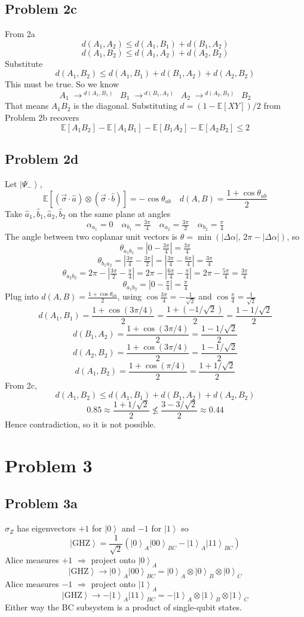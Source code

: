 \documentclass[
]{article}
\providecommand{\ket}[1]{\left\lvert #1 \right\rangle}
\providecommand{\Rarr}{\Rightarrow}
\providecommand{\rarr}{\rightarrow}
\begin{document}
\subsection*{Problem 2c}
From 2a
\[
	d(A_1,A_2)\leq d(A_1,B_1)+d(B_1,A_2)
\]
\[
	d(A_1,B_2)\leq d(A_1,A_2)+d(A_2,B_2)
\]
Substitute
\[
	d(A_1,B_2)\leq d(A_1,B_1)+d(B_1,A_2)+d(A_2,B_2)
\]
This must be true.
So we know
\[
	A_1\;\rarr^{\;d(A_1,B_1)\;}\;B_1\;\rarr^{\;d(B_1,A_2)\;}\;A_2\;\rarr^{\;d(A_2,B_2)\;}\;B_2
\]
That means $A_1B_2$ is the diagonal.
Substituting $d=(1-\mathbb{E}[XY])/2$ from Problem 2b recovers
\[
	\mathbb{E}[A_1B_2]-\mathbb{E}[A_1B_1]-\mathbb{E}[B_1A_2]-\mathbb{E}[A_2B_2]\leq 2
\]

\subsection*{Problem 2d}
Let $\ket{\Psi_-}$,
\[
	\mathbb{E}[(\vec{\sigma}\cdot\hat{a})\otimes(\vec{\sigma}\cdot\hat{b})]=-\cos\theta_{ab}\quad d(A,B)=\frac{1+\cos\theta_{ab}}{2}
\]
Take $\hat{a}_1,\hat{b}_1,\hat{a}_2,\hat{b}_2$ on the same plane at angles
\[
	\alpha_{a_1}=0\quad \alpha_{b_1}=\tfrac{3\pi}{4}\quad \alpha_{a_2}=\tfrac{3\pi}{2}\quad \alpha_{b_2}=\tfrac{\pi}{4}
\]
The angle between two coplanar unit vectors is $\theta=\min(|\Delta\alpha|,\,2\pi-|\Delta\alpha|)$, so
\[
	\theta_{a_1b_1}=|0-\tfrac{3\pi}{4}|=\tfrac{3\pi}{4}
\]
\[
	\theta_{b_1a_2}=|\tfrac{3\pi}{4}-\tfrac{3\pi}{2}|=|\tfrac{3\pi}{4}-\tfrac{6\pi}{4}|=\tfrac{3\pi}{4}
\]
\[
	\theta_{a_2b_2}=2\pi-|\tfrac{3\pi}{2}-\tfrac{\pi}{4}|=2\pi-|\tfrac{6\pi}{4}-\tfrac{\pi}{4}|=2\pi-\tfrac{5\pi}{4}=\tfrac{3\pi}{4}
\]
\[
	\theta_{a_1b_2}=|0-\tfrac{\pi}{4}|=\tfrac{\pi}{4}
\]
Plug into $d(A,B)=\frac{1+\cos\theta_{ab}}{2}$, using $\cos\tfrac{3\pi}{4}=-\tfrac{1}{\sqrt{2}}$ and $\cos\tfrac{\pi}{4}=\tfrac{1}{\sqrt{2}}$
\[
	d(A_1,B_1)=\frac{1+\cos(3\pi/4)}{2}=\frac{1+(-1/\sqrt{2})}{2}=\frac{1-1/\sqrt{2}}{2}
\]
\[
	d(B_1,A_2)=\frac{1+\cos(3\pi/4)}{2}=\frac{1-1/\sqrt{2}}{2}
\]
\[
	d(A_2,B_2)=\frac{1+\cos(3\pi/4)}{2}=\frac{1-1/\sqrt{2}}{2}
\]
\[
	d(A_1,B_2)=\frac{1+\cos(\pi/4)}{2}=\frac{1+1/\sqrt{2}}{2}
\]
From 2c,
\[
	d(A_1,B_2)\leq d(A_1,B_1)+d(B_1,A_2)+d(A_2,B_2)
\]
\[
	\;0.85\approx\frac{1+1/\sqrt{2}}{2}\nleq
	\frac{3-3/\sqrt{2}}{2}\approx 0.44\;
\]
Hence contradiction, so it is not possible.

\section*{Problem 3}

\subsection*{Problem 3a}
$\sigma_Z$ has eigenvectors $+1$ for $\ket{0}$ and $-1$ for $\ket{1}$ so
\[
	\ket{\text{GHZ}}=\frac{1}{\sqrt{2}}(\ket{0}_A\ket{00}_{BC}-\ket{1}_A\ket{11}_{BC})
\]
Alice measures $+1$ $\Rarr$ project onto $\ket{0}_A$
\[
	\ket{\text{GHZ}}\rarr\ket{0}_A\ket{00}_{BC}=\ket{0}_A\otimes\ket{0}_B\otimes\ket{0}_C
\]
Alice measures $-1$ $\Rarr$ project onto $\ket{1}_A$
\[
	\ket{\text{GHZ}}\rarr-\ket{1}_A\ket{11}_{BC}=-\ket{1}_A\otimes\ket{1}_B\otimes\ket{1}_C
\]
Either way the BC subsystem is a product of single-qubit states.
\end{document}
